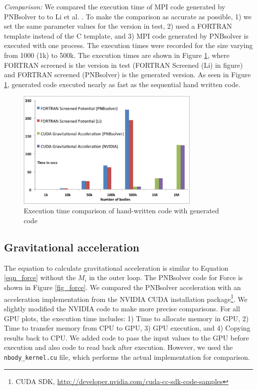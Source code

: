 \documentclass[draftclsnofoot]{elsarticle}
\begin{document}
\textit{Comparison: }
We compared the execution time of MPI code generated by PNBsolver to to Li et al. \cite{li}.  To make the comparison as accurate as possible, 1) we set the same parameter 
values for the version in test, 2) used a FORTRAN template instead of the C template, and 3) MPI code generated by PNBsolver is executed with one process. 
The execution times were recorded for the size varying from 1000 (1k) to 500k. The execution times are shown in Figure \ref{fig_cmp}, where FORTRAN screened \cite{li} is the
version in test (FORTRAN Screened (Li) in figure) and FORTRAN screened (PNBsolver) is the generated version. As seen in Figure \ref{fig_cmp}, generated code executed nearly as fast as the sequential hand written code. 
 

\begin{figure}[!t]
\centering
\includegraphics[width=3.5in]{cmp.eps}
\caption{Execution time comparison of hand-written code with generated code}
\label{fig_cmp}
\end{figure}

\subsection{Gravitational acceleration}
The equation to calculate gravitational acceleration is similar to Equation \ref{eqn_force} without the $M_i$ in the outer loop. The PNBsolver code  for Force is 
shown in Figure \ref{fig_force}. We compared the PNBsolver acceleration with an acceleration implementation from the NVIDIA CUDA installation 
package\footnote{CUDA SDK, \url{http://developer.nvidia.com/cuda-cc-sdk-code-samples}}. We slightly modified the NVIDIA code to make more precise comparisons. For all
GPU plots, the execution time includes: 1) Time to allocate memory in GPU, 2) Time to transfer memory from CPU to GPU, 3) GPU execution, and 4) Copying results back
to CPU. We  added code to pass the input values to the GPU before execution and also code to read back after execution. However, we used the 
\texttt{nbody\_kernel.cu} file, which performs  the actual implementation for comparison. 
\end{document}

